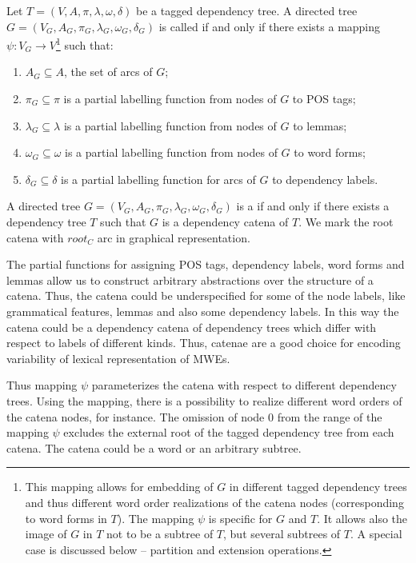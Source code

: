 \documentclass[output=paper,colorlinks,citecolor=brown]{langscibook}
\begin{document}
Let $T = (V,A,\pi, \lambda, \omega, \delta)$ be a tagged dependency tree. A directed tree $G = (V_G,A_G,\pi_G,\lambda_G, \omega_G, \delta_G)$ is called  if and only if there exists a mapping $\psi : V_G \rightarrow V$\footnote{This mapping allows for embedding of $G$ in different tagged dependency trees and thus different word order realizations of the catena nodes (corresponding to word forms in $T$). The mapping $\psi$ is specific for $G$ and $T$. It allows also the image of $G$ in $T$ not to be a subtree of $T$, but several subtrees of $T$. A special case is discussed below -- partition and extension operations.} such that:
\begin{enumerate}

\item $A_G \subseteq A$, the set of arcs of $G$;

\item $\pi_G \subseteq \pi$ is a partial labelling function from nodes of $G$ to POS tags;

\item $\lambda_G \subseteq \lambda$ is a partial labelling function from nodes of $G$ to lemmas;

\item $\omega_G \subseteq \omega$ is a partial labelling function from nodes of $G$ to word forms;


\item $\delta_G \subseteq \delta$ is a partial labelling function for arcs of $G$ to dependency labels.

\end{enumerate}

A directed tree $G = (V_G,A_G,\pi_G,\lambda_G, \omega_G, \delta_G)$ is a  if and only if there exists a dependency tree $T$ such that $G$ is a dependency catena of $T$. We mark the root catena with $root_C$ arc in graphical representation.


The partial functions for assigning POS tags, dependency labels, word forms and lemmas allow us to construct arbitrary abstractions over the structure of a catena. Thus, the catena could be underspecified for some of the node labels, like grammatical features, lemmas and also some dependency labels. In this way the catena could be a dependency catena of dependency trees which differ with respect to labels of different kinds. Thus, catenae are a good choice for encoding variability of lexical representation of MWEs.

Thus mapping $\psi$ parameterizes the catena with respect to different dependency trees. Using the mapping, there is a possibility to realize different word orders of the catena nodes, for instance. The omission of node 0 from the range of the mapping $\psi$ excludes the external root of the tagged dependency tree from each catena. The catena could be a word or an arbitrary subtree.
\end{document}
